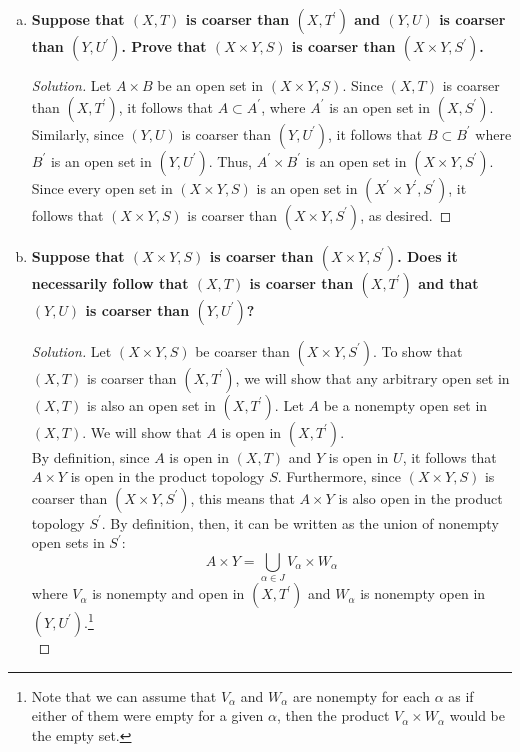 \documentclass[11pt]{article}
\newenvironment{solution}
  {\renewcommand\qedsymbol{$\blacksquare$}\begin{proof}[Solution]}
  {\end{proof}}
\begin{document}
\begin{enumerate}[a)]
	\item \textbf{Suppose that $(X,T)$ is coarser than $(X, T^{\prime})$ and $(Y,U)$ is coarser than $(Y,U^{\prime})$. 
	Prove that $(X \times Y, S)$ is coarser than $(X \times Y, S^{\prime})$.}

	\begin{solution}
	Let $A \times B$ be an open set in $(X \times Y, S)$. Since $(X, T)$ is coarser than $(X, T^{\prime})$, it follows that $A \subset A^{\prime}$, where $A^{\prime}$ is an open
	set in $(X, S^{\prime})$. Similarly, since $(Y, U)$ is coarser than $(Y, U^{\prime})$, it follows that $B \subset B^{\prime}$ where $B^{\prime}$ is an open
	set in $(Y, U^{\prime})$. Thus, $A^{\prime} \times B^{\prime}$ is an open set in $(X \times Y, S^{\prime})$. Since every open set in $(X \times Y, S)$ is an open set in $(X^{\prime} \times Y^{\prime}, S^{\prime})$,
	it follows that $(X \times Y, S)$ is coarser than $(X \times Y, S^{\prime})$, as desired.
	\end{solution}
	
	\item \textbf{Suppose that $(X \times Y, S)$ is coarser than $(X \times Y, S^{\prime})$. 
	Does it necessarily follow that $(X, T)$ is coarser than $(X, T^{\prime})$ and that $(Y, U)$ is coarser than $(Y, U^{\prime})$?}

	\begin{solution}
	Let $(X \times Y, S)$ be coarser than $(X \times Y, S^{\prime})$. To show that $(X, T)$ is coarser than $(X, T^{\prime})$, we will show that any arbitrary open set in $(X, T)$ is also an open set in $(X, T^{\prime})$. 
	Let $A$ be a nonempty open set in $(X, T)$. We will show that $A$ is open in $(X, T^{\prime})$. \\

	By definition, since $A$ is open in $(X, T)$ and $Y$ is open in $U$, it follows that $A \times Y$ is open in the product topology $S$. Furthermore, since $(X \times Y, S)$ is coarser than $(X \times Y, S^{\prime})$, this means that
	$A \times Y$ is also open in the product topology $S^{\prime}$. By definition, then, it can be written as the union of nonempty open sets in $S^{\prime}$:
	\[
		A \times Y = \bigcup\limits_{\alpha \in J} V_{\alpha} \times W_{\alpha}
	\]
	where $V_{\alpha}$ is nonempty and open in $(X, T^{\prime})$ and $W_{\alpha}$ is nonempty open in $(Y, U^{\prime})$.\footnote{Note that we can assume that $V_\alpha$ and $W_\alpha$ are nonempty for each $\alpha$ as if either of them 
	were empty for a given $\alpha$, then the product $V_\alpha \times W_\alpha$ would be the empty set.} \\


\end{solution}
\end{enumerate}
\end{document}
